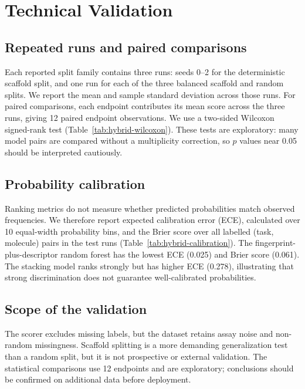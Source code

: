 \section{Technical Validation}
\label{sec:validation}

\subsection{Repeated runs and paired comparisons}
Each reported split family contains three runs: seeds 0--2 for the deterministic scaffold
split, and one run for each of the three balanced scaffold and random splits. We report
the mean and sample standard deviation across those runs. For paired comparisons, each
endpoint contributes its mean score across the three runs, giving 12 paired endpoint
observations. We use a two-sided Wilcoxon signed-rank test
(Table~\ref{tab:hybrid-wilcoxon}). These tests are exploratory: many model pairs are
compared without a multiplicity correction, so $p$ values near 0.05 should be interpreted
cautiously.

\subsection{Probability calibration}
Ranking metrics do not measure whether predicted probabilities match observed frequencies.
We therefore report expected calibration error (ECE), calculated over 10 equal-width
probability bins, and the Brier score over all labelled (task, molecule) pairs in the test
runs (Table~\ref{tab:hybrid-calibration}). The fingerprint-plus-descriptor random forest
has the lowest ECE (0.025) and Brier score (0.061). The stacking model ranks strongly but
has higher ECE (0.278), illustrating that strong discrimination does not guarantee
well-calibrated probabilities.

\subsection{Scope of the validation}
The scorer excludes missing labels, but the dataset retains assay noise and non-random
missingness. Scaffold splitting is a more demanding generalization test than a random
split, but it is not prospective or external validation. The statistical comparisons use
12 endpoints and are exploratory; conclusions should be confirmed on additional data
before deployment.
